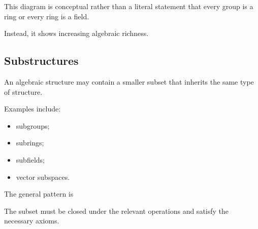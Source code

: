 \begin{center}
\end{center}

This diagram is conceptual rather than a literal statement that every group is
a ring or every ring is a field.

Instead, it shows increasing algebraic richness.

\subsection{Substructures}
\label{subsec:substructures}

An algebraic structure may contain a smaller subset that inherits the same
type of structure.

Examples include:

\begin{itemize}
    \item subgroups;
    \item subrings;
    \item subfields;
    \item vector subspaces.
\end{itemize}

The general pattern is

\begin{center}
\end{center}

The subset must be closed under the relevant operations and satisfy the
necessary axioms.

